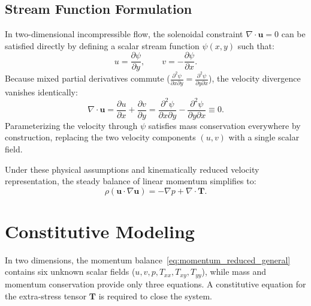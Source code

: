 \subsection{Stream Function Formulation}
\label{subsec:stream_function_formulation}
In two-dimensional incompressible flow, the solenoidal constraint $\nabla \cdot \boldsymbol{u} = 0$ can be satisfied directly by defining a scalar stream function $\psi(x, y)$ such that:
\begin{equation}
    u = \frac{\partial \psi}{\partial y}, \qquad v = -\frac{\partial \psi}{\partial x} .
    \label{eq:stream_function_def}
\end{equation}
Because mixed partial derivatives commute ($\frac{\partial^2 \psi}{\partial x
\partial y} = \frac{\partial^2 \psi}{\partial y \partial x}$), the velocity
divergence vanishes identically:
\begin{equation}
    \nabla \cdot \boldsymbol{u} = \frac{\partial u}{\partial x} + \frac{\partial v}{\partial y} = \frac{\partial^2 \psi}{\partial x \partial y} - \frac{\partial^2 \psi}{\partial y \partial x} \equiv 0 .
    \label{eq:divergence_free_identity}
\end{equation}
Parameterizing the velocity through $\psi$ satisfies mass conservation everywhere
by construction, replacing the two velocity components $(u, v)$ with a single
scalar field.

Under these physical assumptions and kinematically reduced velocity representation,
the steady balance of linear momentum simplifies to:
\begin{equation}
    \rho (\boldsymbol{u} \cdot \nabla \boldsymbol{u}) = -\nabla p + \nabla \cdot \boldsymbol{T} .
    \label{eq:momentum_reduced_general}
\end{equation}

\section{Constitutive Modeling}
\label{sec:constitutive_models}

In two dimensions, the momentum balance~\eqref{eq:momentum_reduced_general} contains
six unknown scalar fields ($u, v, p, T_{xx}, T_{xy}, T_{yy}$),
while mass and momentum conservation provide only three equations.
A constitutive equation for the extra-stress tensor $\boldsymbol{T}$ is required to close the system.

